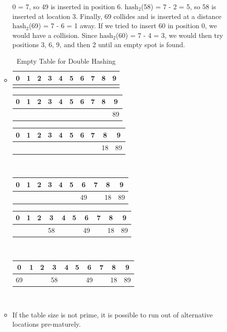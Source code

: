 \documentclass[a4paper,oneside]{book}
\begin{document}
\begin{itemize}
\begin{itemize}
0 = 7, so 49 is inserted in position 6. $\text{hash}_2$(58) = 7 - 2 = 5, so 58
is inserted at location 3. Finally, 69 collides and is inserted at a distance
$\text{hash}_2$(69) = 7 - 6 = 1 away. If we tried to insert 60 in position 0, we
would have a collision. Since $\text{hash}_2$(60) = 7 - 4 = 3, we would then try
positions 3, 6, 9, and then 2 until an empty spot is found.
\item \begin{table}
\centering
\caption{Empty Table for Double Hashing}
\label{HashKeyLinearProbing}
\begin{tabular}{|cccccccccc|}
\hline
0 & 1 & 2 & 3 & 4 & 5 & 6 & 7 & 8 & 9\\ \hline
& & & & & & & & & \\ \hline
\end{tabular}
\end{table}
\begin{tabular}[H]{|cccccccccc|}
\hline
0 & 1 & 2 & 3 & 4 & 5 & 6 & 7 & 8 & 9\\ \hline
& & & & & & & & & 89\\ \hline
\end{tabular}
\begin{tabular}[H]{|cccccccccc|}
\hline
0 & 1 & 2 & 3 & 4 & 5 & 6 & 7 & 8 & 9\\ \hline
& & & & & & & & 18 & 89\\ \hline
\end{tabular}\\
\begin{tabular}[H]{|cccccccccc|}
\hline
0 & 1 & 2 & 3 & 4 & 5 & 6 & 7 & 8 & 9\\ \hline
 &  & & & & & 49 & & 18 & 89\\ \hline
\end{tabular}
\begin{tabular}[H]{|cccccccccc|}
\hline
0 & 1 & 2 & 3 & 4 & 5 & 6 & 7 & 8 & 9\\ \hline
 &  &  & 58 & & & 49 & & 18 & 89 \\ \hline
\end{tabular}\\
\begin{tabular}[H]{|cccccccccc|}
\hline
0 & 1 & 2 & 3 & 4 & 5 & 6 & 7 & 8 & 9\\ \hline
69 &  &  & 58 & & & 49 & & 18 & 89 \\ \hline
\end{tabular}\\
\item If the table size is not prime, it is possible to run out of alternative
locations pre-maturely.
\end{itemize}
\end{itemize}
\end{document}
